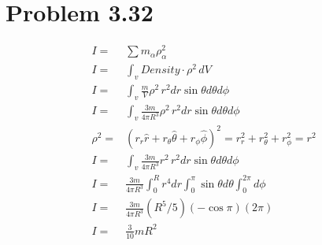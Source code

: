\documentclass[12pt, a4paper]{article}
\begin{document}
\pagebreak
\section*{Problem 3.32}
\begin{align*}
I =& \sum m_\alpha \rho_\alpha^2
\\
I =& \int_v \textit{Density} \cdot \rho^2 \, dV
\\
I =& \int_v \frac{m}{V}  \rho^2 \, r^2 dr \sin\theta d\theta d\phi
\\
I =& \int_v \frac{3m}{4\pi R^3} \rho^2 \, r^2 dr \sin\theta d\theta d\phi
\\
\rho^2 =& (r_r\hat{r} + r_\theta\hat{\theta} + r_\phi\hat{\phi})^2 
= r_r^2 + r_\theta^2 + r_\phi^2 = r^2
\\
I =& \int_v \frac{3m}{4\pi R^3} r^2 \, r^2 dr \sin\theta d\theta d\phi
\\
I =& \frac{3m}{4\pi R^3}
\int_0^R  r^4 dr 
\int_0^\pi\sin\theta d\theta 
\int_0^{2\pi} d\phi
\\
I =& \frac{3m}{4\pi R^3}(R^5/5) (-\cos\pi)(2\pi)
\\
I =& \tfrac{3}{10}mR^2
\\
\end{align*}
\end{document}
